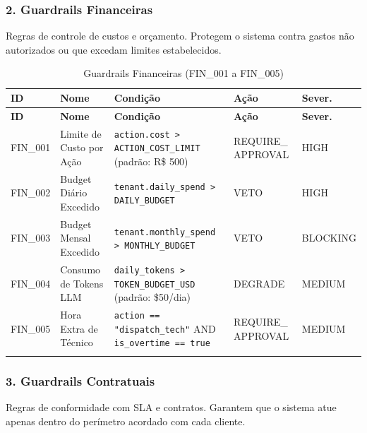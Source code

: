 \documentclass[12pt, a4paper]{article}
\begin{document}
\subsubsection{2. Guardrails Financeiras}

Regras de controle de custos e orçamento. Protegem o sistema contra gastos não autorizados ou que excedam limites estabelecidos.

{\small
\begin{longtable}{|p{2cm}|p{2.8cm}|p{5.5cm}|p{2cm}|p{2cm}|}
\hline
\textbf{ID} & \textbf{Nome} & \textbf{Condição} & \textbf{Ação} & \textbf{Sever.} \\ \hline
\endfirsthead
\hline
\textbf{ID} & \textbf{Nome} & \textbf{Condição} & \textbf{Ação} & \textbf{Sever.} \\ \hline
\endhead

FIN\_001 & Limite de Custo por Ação & \texttt{action.cost > ACTION\_COST\_LIMIT} (padrão: R\$ 500) & REQUIRE\_ APPROVAL & HIGH \\ \hline

FIN\_002 & Budget Diário Excedido & \texttt{tenant.daily\_spend > DAILY\_BUDGET} & VETO & HIGH \\ \hline

FIN\_003 & Budget Mensal Excedido & \texttt{tenant.monthly\_spend > MONTHLY\_BUDGET} & VETO & BLOCKING \\ \hline

FIN\_004 & Consumo de Tokens LLM & \texttt{daily\_tokens > TOKEN\_BUDGET\_USD} (padrão: \$50/dia) & DEGRADE & MEDIUM \\ \hline

FIN\_005 & Hora Extra de Técnico & \texttt{action == "dispatch\_tech"} AND \texttt{is\_overtime == true} & REQUIRE\_ APPROVAL & MEDIUM \\ \hline

\caption{Guardrails Financeiras (FIN\_001 a FIN\_005)}
\end{longtable}
}

\subsubsection{3. Guardrails Contratuais}

Regras de conformidade com SLA e contratos. Garantem que o sistema atue apenas dentro do perímetro acordado com cada cliente.
\end{document}
